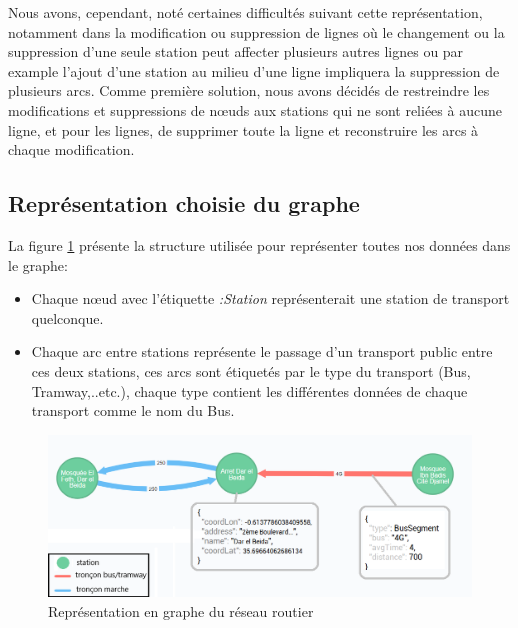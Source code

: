 \begin{itemize}
	Nous avons, cependant, noté certaines difficultés suivant cette représentation, notamment dans la modification ou suppression de lignes où le changement ou la suppression d'une seule station peut affecter plusieurs autres lignes ou par example l'ajout d'une station au milieu d'une ligne impliquera la suppression de plusieurs arcs.
	Comme première solution, nous avons décidés de restreindre les modifications et suppressions de nœuds aux stations qui ne sont reliées à aucune ligne, et pour les lignes, de supprimer toute la ligne et reconstruire les arcs à chaque modification.
	     
\end{itemize}
\subsection{Représentation choisie du graphe}
La figure \ref{fig:structGraph} présente la structure utilisée pour représenter toutes nos données dans le graphe:
\begin{itemize}
	\item Chaque nœud avec l'étiquette \emph{:Station} représenterait une station de transport quelconque.
	\item Chaque arc entre stations représente le passage d'un transport public entre ces deux stations, ces arcs sont étiquetés par le type du transport (Bus, Tramway,..etc.), chaque type contient les différentes données de chaque transport comme le nom du Bus.
\end{itemize}

\begin{figure}[h!]
	\center
	\includegraphics[width=\textwidth]{img/structureGraphe.png}
	\caption{Représentation en graphe du réseau routier}
	\label{fig:structGraph}
\end{figure}

